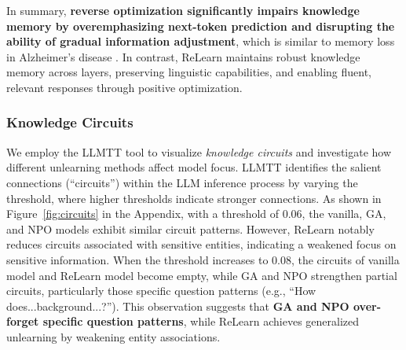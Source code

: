 In summary, \textbf{reverse optimization significantly impairs knowledge memory by overemphasizing next-token prediction and disrupting the ability of gradual information adjustment}, which is similar to memory loss in Alzheimer's disease \citep{Jahn2013memoryloss}. 
In contrast, ReLearn maintains robust knowledge memory across layers, preserving linguistic capabilities, and enabling fluent, relevant responses through positive optimization.

\subsubsection{Knowledge Circuits}
We employ the LLMTT tool \citep{tufanov2024lm} to visualize \textit{knowledge circuits} and investigate how different unlearning methods affect model focus.
LLMTT identifies the salient connections (``circuits'') within the LLM inference process by varying the threshold, where higher thresholds indicate stronger connections.
As shown in Figure~\ref{fig:circuits} in the Appendix, with a threshold of 0.06, the vanilla, GA, and NPO models exhibit similar circuit patterns. 
However, ReLearn notably reduces circuits associated with sensitive entities, indicating a weakened focus on sensitive information.
When the threshold increases to 0.08, the circuits of vanilla model and ReLearn model become empty, while GA and NPO strengthen partial circuits, particularly those specific question patterns (e.g., ``How does...background...?'').
This observation suggests that \textbf{GA and NPO over-forget specific question patterns}, while ReLearn achieves generalized unlearning by weakening entity associations.
